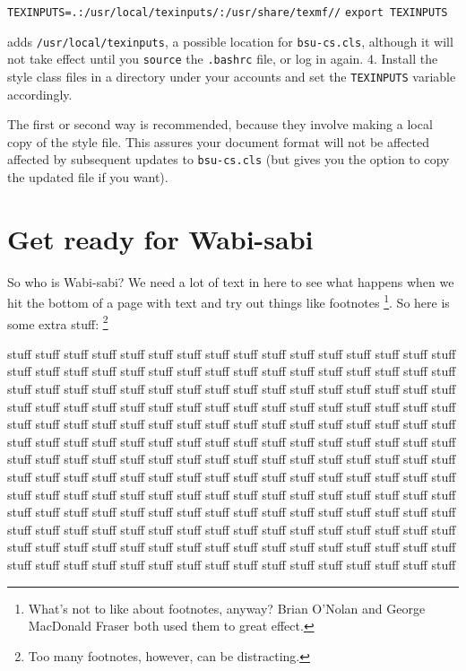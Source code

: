 \documentclass[
  dissertation]{bsu-cs}
\begin{document}
\texttt{TEXINPUTS=.:/usr/local/texinputs/:/usr/share/texmf//}
\texttt{export\ TEXINPUTS}

adds \texttt{/usr/local/texinputs}, a possible location for
\texttt{bsu-cs.cls}, although it will not take effect until you
\texttt{source} the \texttt{.bashrc} file, or log in again. 4. Install
the style class files in a directory under your accounts and set the
\texttt{TEXINPUTS} variable accordingly.

The first or second way is recommended, because they involve making a
local copy of the style file. This assures your document format will not
be affected affected by subsequent updates to \texttt{bsu-cs.cls} (but
gives you the option to copy the updated file if you want).

\section{Get ready for Wabi-sabi}\label{sec-getReady}

So who is Wabi-sabi? We need a lot of text in here to see what happens
when we hit the bottom of a page with text and try out things like
footnotes \footnote{What's not to like about footnotes, anyway? Brian
  O'Nolan and George MacDonald Fraser both used them to great effect.}.
So here is some extra stuff: \footnote{Too many footnotes, however, can
  be distracting.}

stuff stuff stuff stuff stuff stuff stuff stuff stuff stuff stuff stuff
stuff stuff stuff stuff stuff stuff stuff stuff stuff stuff stuff stuff
stuff stuff stuff stuff stuff stuff stuff stuff stuff stuff stuff stuff
stuff stuff stuff stuff stuff stuff stuff stuff stuff stuff stuff stuff
stuff stuff stuff stuff stuff stuff stuff stuff stuff stuff stuff stuff
stuff stuff stuff stuff stuff stuff stuff stuff stuff stuff stuff stuff
stuff stuff stuff stuff stuff stuff stuff stuff stuff stuff stuff stuff
stuff stuff stuff stuff stuff stuff stuff stuff stuff stuff stuff stuff
stuff stuff stuff stuff stuff stuff stuff stuff stuff stuff stuff stuff
stuff stuff stuff stuff stuff stuff stuff stuff stuff stuff stuff stuff
stuff stuff stuff stuff stuff stuff stuff stuff stuff stuff stuff stuff
stuff stuff stuff stuff stuff stuff stuff stuff stuff stuff stuff stuff
stuff stuff stuff stuff stuff stuff stuff stuff stuff stuff stuff stuff
stuff stuff stuff stuff stuff stuff stuff stuff stuff stuff stuff stuff
stuff stuff stuff stuff stuff stuff stuff stuff stuff stuff stuff stuff
stuff stuff stuff stuff stuff stuff stuff stuff stuff stuff stuff stuff
stuff stuff stuff stuff stuff stuff stuff stuff stuff stuff stuff stuff
stuff stuff stuff stuff
\end{document}
